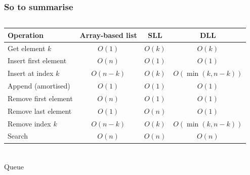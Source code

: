 \begin{frame}
	\frametitle{So to summarise}
\begin{columns}
	\begin{tabular}{l | c | c | c}
	Operation & Array-based list & SLL & DLL \\	
	\midrule
	Get element $k$ & $O(1)$ &$O(k)$ & $O(k)$ \\
	\pause
	Insert first element& $O(n)$ & $O(1)$ & $O(1)$\\
	Insert at index $k$& $O(n-k)$ & $O(k)$ & $O(\min(k,n-k))$\\
	Append (amortised)& $O(1)$ & $O(1)$ & $O(1)$\\
	\pause
	Remove first element& $O(n)$ & $O(1)$ & $O(1)$\\
	Remove last element& $O(1)$ & $O(n)$ & $O(1)$\\
	Remove index $k$& $O(n-k)$ & $O(k)$ & $O(\min(k,n-k))$\\
	\pause
	Search & $O(n)$ & $O(n)$ & $O(n)$\\
	\end{tabular}
		
		
\end{columns}

\end{frame}

\begin{frame}[fragile]\frametitle{}
\begin{center}
{\Large Queue}
\end{center}

\end{frame}

